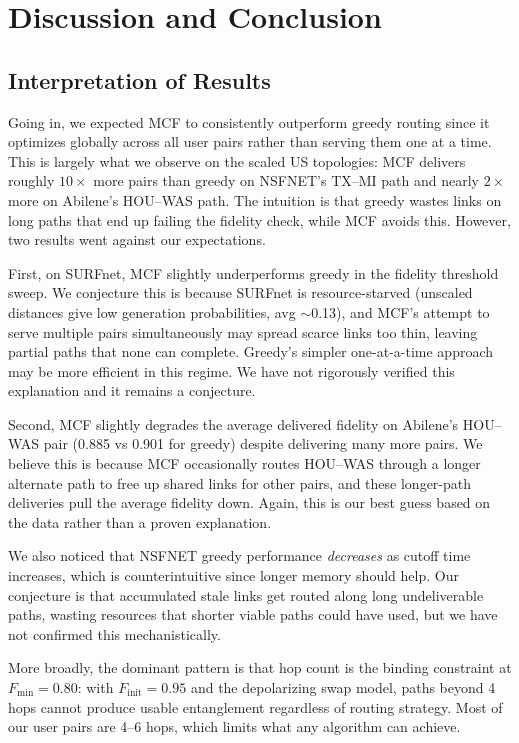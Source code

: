 \section{Discussion and Conclusion}
\label{sec:discussion}

\subsection{Interpretation of Results}

Going in, we expected MCF to consistently outperform greedy routing since it optimizes globally across all user pairs rather than serving them one at a time. This is largely what we observe on the scaled US topologies: MCF delivers roughly $10\times$ more pairs than greedy on NSFNET's TX--MI path and nearly $2\times$ more on Abilene's HOU--WAS path. The intuition is that greedy wastes links on long paths that end up failing the fidelity check, while MCF avoids this. However, two results went against our expectations.

First, on SURFnet, MCF slightly underperforms greedy in the fidelity threshold sweep. We conjecture this is because SURFnet is resource-starved (unscaled distances give low generation probabilities, avg $\sim$0.13), and MCF's attempt to serve multiple pairs simultaneously may spread scarce links too thin, leaving partial paths that none can complete. Greedy's simpler one-at-a-time approach may be more efficient in this regime. We have not rigorously verified this explanation and it remains a conjecture.

Second, MCF slightly degrades the average delivered fidelity on Abilene's HOU--WAS pair (0.885 vs 0.901 for greedy) despite delivering many more pairs. We believe this is because MCF occasionally routes HOU--WAS through a longer alternate path to free up shared links for other pairs, and these longer-path deliveries pull the average fidelity down. Again, this is our best guess based on the data rather than a proven explanation.

We also noticed that NSFNET greedy performance \emph{decreases} as cutoff time increases, which is counterintuitive since longer memory should help. Our conjecture is that accumulated stale links get routed along long undeliverable paths, wasting resources that shorter viable paths could have used, but we have not confirmed this mechanistically.

More broadly, the dominant pattern is that hop count is the binding constraint at $F_\text{min} = 0.80$: with $F_\text{init} = 0.95$ and the depolarizing swap model, paths beyond 4 hops cannot produce usable entanglement regardless of routing strategy. Most of our user pairs are 4--6 hops, which limits what any algorithm can achieve.

